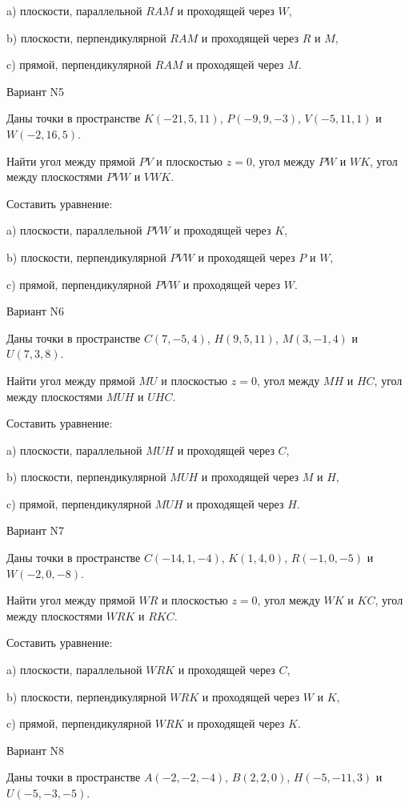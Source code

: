 \documentclass[11pt]{report}
\begin{document}
a) плоскости, параллельной $RAM$ и проходящей через $W$,

b) плоскости, перпендикулярной $RAM$ и проходящей через $R$ и $M$,

c) прямой, перпендикулярной $RAM$ и проходящей через $M$.

Вариант N5

Даны точки в пространстве
$K(-21, 5, 11)$, $P(-9, 9, -3)$, $V(-5, 11, 1)$ и
$W(-2, 16, 5)$.

Найти угол между прямой $PV$ и плоскостью $z = 0$, угол между $PW$ и $WK$, угол между плоскостями $PVW$ 
и $VWK$.

Составить уравнение: 

a) плоскости, параллельной $PVW$ и проходящей через $K$,

b) плоскости, перпендикулярной $PVW$ и проходящей через $P$ и $W$,

c) прямой, перпендикулярной $PVW$ и проходящей через $W$.

Вариант N6

Даны точки в пространстве
$C(7, -5, 4)$, $H(9, 5, 11)$, $M(3, -1, 4)$ и
$U(7, 3, 8)$.

Найти угол между прямой $MU$ и плоскостью $z = 0$, угол между $MH$ и $HC$, угол между плоскостями $MUH$ 
и $UHC$.

Составить уравнение: 

a) плоскости, параллельной $MUH$ и проходящей через $C$,

b) плоскости, перпендикулярной $MUH$ и проходящей через $M$ и $H$,

c) прямой, перпендикулярной $MUH$ и проходящей через $H$.

Вариант N7

Даны точки в пространстве
$C(-14, 1, -4)$, $K(1, 4, 0)$, $R(-1, 0, -5)$ и
$W(-2, 0, -8)$.

Найти угол между прямой $WR$ и плоскостью $z = 0$, угол между $WK$ и $KC$, угол между плоскостями $WRK$ 
и $RKC$.

Составить уравнение: 

a) плоскости, параллельной $WRK$ и проходящей через $C$,

b) плоскости, перпендикулярной $WRK$ и проходящей через $W$ и $K$,

c) прямой, перпендикулярной $WRK$ и проходящей через $K$.

Вариант N8

Даны точки в пространстве
$A(-2, -2, -4)$, $B(2, 2, 0)$, $H(-5, -11, 3)$ и
$U(-5, -3, -5)$.
\end{document}
